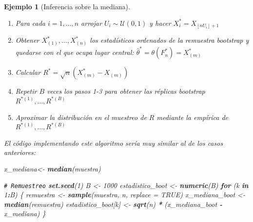 \documentclass[
]{book}
\newenvironment{Shaded}{\begin{snugshade}}{\end{snugshade}}
\newcommand{\AttributeTok}[1]{\textcolor[rgb]{0.13,0.29,0.53}{#1}}
\newcommand{\CommentTok}[1]{\textcolor[rgb]{0.56,0.35,0.01}{\textit{#1}}}
\newcommand{\ConstantTok}[1]{\textcolor[rgb]{0.56,0.35,0.01}{#1}}
\newcommand{\ControlFlowTok}[1]{\textcolor[rgb]{0.13,0.29,0.53}{\textbf{#1}}}
\newcommand{\DecValTok}[1]{\textcolor[rgb]{0.00,0.00,0.81}{#1}}
\newcommand{\FunctionTok}[1]{\textcolor[rgb]{0.13,0.29,0.53}{\textbf{#1}}}
\newcommand{\NormalTok}[1]{#1}
\newcommand{\OtherTok}[1]{\textcolor[rgb]{0.56,0.35,0.01}{#1}}
\newcommand{\SpecialCharTok}[1]{\textcolor[rgb]{0.81,0.36,0.00}{\textbf{#1}}}
\theoremstyle{break}
\newtheorem{example}{Ejemplo}[chapter]
\theoremstyle{nonumberplain}
\renewcommand{\CommentTok}[1]{\textcolor[rgb]{0.41,0.41,0.41}{\texttt{#1}}}
\begin{document}
\begin{example}[Inferencia sobre la mediana]
\begin{enumerate}
\def\labelenumi{\arabic{enumi}.}
\item
  Para cada \(i=1,\ldots ,n\) arrojar \(U_i\sim \mathcal{U}\left( 0,1 \right)\) y
  hacer \(X_i^{\ast}=X_{\left\lfloor nU_i\right\rfloor +1}\)
\item
  Obtener \(X_{(1)}^{\ast},\ldots ,X_{(n)}^{\ast}\)
  los estadísticos ordenados de la remuestra bootstrap y quedarse con
  el que ocupa lugar central:
  \(\hat{\theta}^{\ast}=\theta \left( F_n^{\ast} \right) =X_{(m)}^{\ast}\)
\item
  Calcular
  \(R^{\ast}=\sqrt{n}\left( X_{(m)}^{\ast}-X_{\left(m \right)} \right)\)
\item
  Repetir \(B\) veces los pasos 1-3 para obtener las réplicas bootstrap
  \(R^{\ast (1)}, \ldots, R^{\ast (B)}\)
\item
  Aproximar la distribución en el muestreo de \(R\) mediante la empírica
  de \(R^{\ast (1)}, \ldots, R^{\ast (B)}\)
\end{enumerate}

El código implementando este algoritmo sería muy similar al de los casos anteriores:

\begin{Shaded}
\begin{Highlighting}[]
\NormalTok{x\_mediana}\OtherTok{\textless{}{-}} \FunctionTok{median}\NormalTok{(muestra)}

\CommentTok{\# Remuestreo}
\FunctionTok{set.seed}\NormalTok{(}\DecValTok{1}\NormalTok{)}
\NormalTok{B }\OtherTok{\textless{}{-}} \DecValTok{1000}
\NormalTok{estadistico\_boot }\OtherTok{\textless{}{-}} \FunctionTok{numeric}\NormalTok{(B)}
\ControlFlowTok{for}\NormalTok{ (k }\ControlFlowTok{in} \DecValTok{1}\SpecialCharTok{:}\NormalTok{B) \{}
\NormalTok{  remuestra }\OtherTok{\textless{}{-}} \FunctionTok{sample}\NormalTok{(muestra, n, }\AttributeTok{replace =} \ConstantTok{TRUE}\NormalTok{)}
\NormalTok{  x\_mediana\_boot }\OtherTok{\textless{}{-}} \FunctionTok{median}\NormalTok{(remuestra)}
\NormalTok{  estadistico\_boot[k] }\OtherTok{\textless{}{-}} \FunctionTok{sqrt}\NormalTok{(n) }\SpecialCharTok{*}\NormalTok{ (x\_mediana\_boot }\SpecialCharTok{{-}}\NormalTok{ x\_mediana)}
\NormalTok{\}}


\end{Highlighting}
\end{Shaded}
\end{example}
\end{document}
